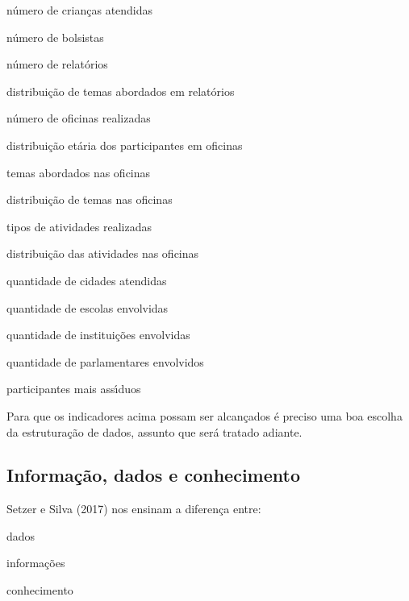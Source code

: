 \documentclass[
12pt,		%
openright,	%
twoside,  %
a4paper,			%
chapter=TITLE,		%
english,			%
french,				%
spanish,			%
brazil				%
]{USPSC-classe/USPSC}
\begin{document}
\begin{alineas}
\item n\'umero de crian\c{c}as atendidas
\item n\'umero de bolsistas
\item n\'umero de relat\'orios
\item distribui\c{c}\~ao de temas abordados em relat\'orios
\item n\'umero de oficinas realizadas
\item distribui\c{c}\~ao et\'aria dos participantes em oficinas
\item temas abordados nas oficinas
\item distribui\c{c}\~ao de temas nas oficinas
\item tipos de atividades realizadas
\item distribui\c{c}\~ao das atividades nas oficinas
\item quantidade de cidades atendidas
\item quantidade de escolas envolvidas
\item quantidade de institui\c{c}\~oes envolvidas
\item quantidade de parlamentares envolvidos
\item participantes mais ass\'{\i}duos
\end{alineas}

Para que os indicadores acima possam ser alcan\c{c}ados \'e preciso uma boa escolha da estrutura\c{c}\~ao de dados, assunto que ser\'a tratado adiante.










\subsection[Informa\c{c}\~ao, dados e conhecimento]{Informa\c{c}\~ao, dados e conhecimento}\label{Informa\c{c}\~ao, dados e conhecimento}
 Setzer e Silva (2017)  nos ensinam a diferen\c{c}a entre:











\begin{alineas}
\item dados
\item informa\c{c}\~oes
\item conhecimento
\end{alineas}
\end{document}
